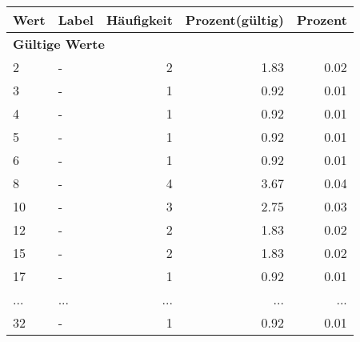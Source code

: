      \begin{longtable}{lXrrr}
     \toprule
     \textbf{Wert} & \textbf{Label} & \textbf{Häufigkeit} & \textbf{Prozent(gültig)} & \textbf{Prozent} \\
     \endhead
     \midrule
     \multicolumn{5}{l}{\textbf{Gültige Werte}}\\
        2 & \multicolumn{1}{X}{-} & %
          \num{2} &
          \num[round-mode=places,round-precision=2]{1.83} &
          \num[round-mode=places,round-precision=2]{0.02} \\
        3 & \multicolumn{1}{X}{-} & %
          \num{1} &
          \num[round-mode=places,round-precision=2]{0.92} &
          \num[round-mode=places,round-precision=2]{0.01} \\
        4 & \multicolumn{1}{X}{-} & %
          \num{1} &
          \num[round-mode=places,round-precision=2]{0.92} &
          \num[round-mode=places,round-precision=2]{0.01} \\
        5 & \multicolumn{1}{X}{-} & %
          \num{1} &
          \num[round-mode=places,round-precision=2]{0.92} &
          \num[round-mode=places,round-precision=2]{0.01} \\
        6 & \multicolumn{1}{X}{-} & %
          \num{1} &
          \num[round-mode=places,round-precision=2]{0.92} &
          \num[round-mode=places,round-precision=2]{0.01} \\
        8 & \multicolumn{1}{X}{-} & %
          \num{4} &
          \num[round-mode=places,round-precision=2]{3.67} &
          \num[round-mode=places,round-precision=2]{0.04} \\
        10 & \multicolumn{1}{X}{-} & %
          \num{3} &
          \num[round-mode=places,round-precision=2]{2.75} &
          \num[round-mode=places,round-precision=2]{0.03} \\
        12 & \multicolumn{1}{X}{-} & %
          \num{2} &
          \num[round-mode=places,round-precision=2]{1.83} &
          \num[round-mode=places,round-precision=2]{0.02} \\
        15 & \multicolumn{1}{X}{-} & %
          \num{2} &
          \num[round-mode=places,round-precision=2]{1.83} &
          \num[round-mode=places,round-precision=2]{0.02} \\
        17 & \multicolumn{1}{X}{-} & %
          \num{1} &
          \num[round-mode=places,round-precision=2]{0.92} &
          \num[round-mode=places,round-precision=2]{0.01} \\
       ... & ... & ... & ... & ... \\
        32 & \multicolumn{1}{X}{-} & %
          \num{1} &
          \num[round-mode=places,round-precision=2]{0.92} &
          \num[round-mode=places,round-precision=2]{0.01} \\


\end{longtable}
